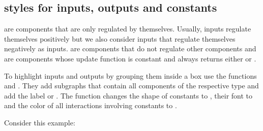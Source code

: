 \documentclass[letterpaper,10pt,english]{sphinxmanual}
\begin{document}
\subsection{styles for inputs, outputs and constants}
\label{\detokenize{Manual:styles-for-inputs-outputs-and-constants}}
 are components that are only regulated by themselves.
Usually, inputs regulate themselves positively but we also consider inputs that regulate themselves negatively as inputs.
 are components that do not regulate other components and  are components whose update function is constant and always returns either  or .

To highlight inputs and outputs by grouping them inside a box use the functions {\hyperref[\detokenize{InteractionGraphs:add-style-inputs}]{}} and {\hyperref[\detokenize{InteractionGraphs:add-style-outputs}]{}}.
They add  subgraphs that contain all components of the respective type and add the label  or .
The function {\hyperref[\detokenize{InteractionGraphs:add-style-constants}]{}} changes the shape of constants to ,
their font to  and the color of all interactions involving constants to .

Consider this example:
\end{document}

